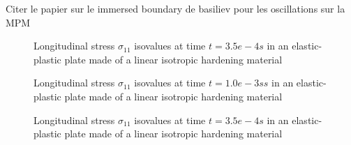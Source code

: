 Citer le papier sur le immersed boundary de basiliev pour les oscillations sur la MPM

\begin{figure}[h!]
  \centering
  
  \caption{Longitudinal stress $\sigma_{11}$ isovalues at time $t=3.5e-4s$ in an elastic-plastic plate made of a linear isotropic hardening material}
  \label{fig:2dEP_comparison1}
\end{figure}

\begin{figure}[h!]
  \centering
  
  \caption{Longitudinal stress $\sigma_{11}$ isovalues at time $t=1.0e-3ss$ in an elastic-plastic plate made of a linear isotropic hardening material}
  \label{fig:2dEP_comparison2}
\end{figure}
%

\begin{figure}[h!]
  \centering
  
  \caption{Longitudinal stress $\sigma_{11}$ isovalues at time $t=3.5e-4s$ in an elastic-plastic plate made of a linear isotropic hardening material}
  \label{fig:2dEP_comparison1}
\end{figure}

